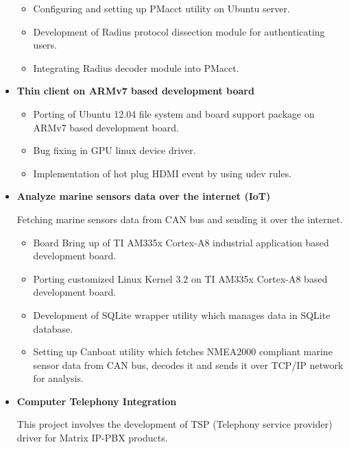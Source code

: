 \documentclass[letterpaper,10pt]{article}
\newcommand{\resitem}[1]{\item #1 \vspace{-2pt}}
\begin{document}
\begin{itemize}
	\begin{itemize}
	    \resitem{Configuring and setting up PMacct utility on Ubuntu server.}
	
	    \resitem{Development of Radius protocol dissection module for authenticating users.}
		
		\resitem{Integrating Radius decoder module into PMacct.}
	\end{itemize}
	
\item
    \textbf{Thin client on ARMv7 based development board}
    
	\begin{itemize}
	    \resitem{Porting of Ubuntu 12.04 file system and board support package on ARMv7 based development board.}
	    
	    \resitem{Bug fixing in GPU linux device driver.}
	    
	    \resitem{Implementation of hot plug HDMI event by using udev rules.}
	    
	\end{itemize}
	
\newpage
	
\item
    \textbf{Analyze marine sensors data over the internet (IoT)}
	
    Fetching marine sensors data from CAN bus and sending it over the internet.
    
	\begin{itemize}
	    \resitem{Board Bring up of TI AM335x Cortex-A8 industrial application based development board.}
	
	    \resitem{Porting customized Linux Kernel 3.2 on TI AM335x Cortex-A8 based development board.}
	    
	    \resitem{Development of SQLite wrapper utility which manages data in SQLite database.}
	    
	    \resitem{Setting up Canboat utility which fetches NMEA2000 compliant marine sensor data from CAN bus, decodes it and sends it over TCP/IP network for analysis.}

	\end{itemize}
	
\item
    \textbf{Computer Telephony Integration}
    
    This project involves the development of TSP (Telephony service provider) driver for Matrix IP-PBX products.
    

\end{itemize}
\end{document}
